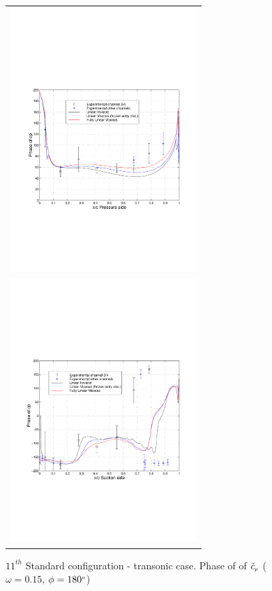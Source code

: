 %
\begin{figure}
 \begin{center}
  \begin{tabular}{c}
    {\includegraphics[height=100mm,clip=t]{CHAP_LINEAR/FIGURE/unsteady_blade_099_180_3.pdf}}\\
    {\includegraphics[height=100mm,clip=t]{CHAP_LINEAR/FIGURE/unsteady_blade_099_180_4.pdf}}
  \end{tabular}
 \end{center}
 \vspace{-7mm}
 \caption{$11^{th}$ Standard configuration - transonic case.
          Phase of of $\tilde{c}_{\mbox{\tiny $p$}}$
         ($\omega = 0.15$, $\phi = 180^{\mbox{\tiny $o$}}$)}
 \label{transonic_11_phas.fig}
\end{figure}
%
